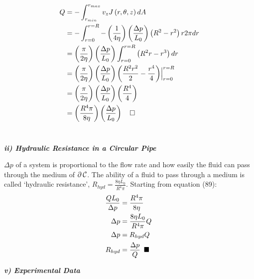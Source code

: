 \documentclass[titlepage]{article}
\begin{document}
    \begin{align}
        Q&= -\int_{r_{min}}^{r_{max}}v_{z}J\left(r,\theta,z\right)dA\\
        &= -\int_{r=0}^{r=R}-\left(\displaystyle\frac{1}{4\eta}\right)
        \left(\displaystyle\frac{\Delta{p}}{L_{0}}\right)\left(R^2-r^2\right){r}2\pi{dr} \\
        &= \left(\displaystyle\frac{\pi}{2\eta}\right)
        \left(\displaystyle\frac{\Delta{p}}{L_{0}}\right)\int_{r=0}^{r=R}\left(R^2r-r^3\right)dr \\
        &=\left(\displaystyle\frac{\pi}{2\eta}\right)
        \left(\displaystyle\frac{\Delta{p}}{L_{0}}\right)\left(\displaystyle\frac{R^2r^2}{2}-\displaystyle\frac{r^4}{4}\right)\Bigr|_{r=0}^{r=R} \\
        &=\left(\displaystyle\frac{\pi}{2\eta}\right)
        \left(\displaystyle\frac{\Delta{p}}{L_{0}}\right)\left(\displaystyle\frac{R^4}{4}\right) \\
        &=\left(\displaystyle\frac{R^4\pi}{8\eta}\right)
        \left(\displaystyle\frac{\Delta{p}}{L_{0}}\right)\hspace*{5pt}\hspace*{5pt}\square
    \end{align} \\
    
    \begin{center}
        \textbf{\emph{ii) Hydraulic Resistance in a Circular Pipe}}
    \end{center}
    $\Delta p$ of a system is proportional to the flow rate and how easily the fluid can pass through the medium of $\partial\hspace*{2pt}\mathcal{C}$. The ability of a fluid to pass through a medium is called `hydraulic resistance', $R_{hyd}=\displaystyle\frac{8\eta{L_{0}}}{R^4\pi}$. Starting from equation (89): 
    \begin{align}
        \displaystyle\frac{{Q}{L_{0}}}{\Delta p} &= \displaystyle\frac{R^4\pi}{8\eta} \\
        \Delta p &= \displaystyle\frac{8\eta{L_{0}}}{R^4\pi}{Q} \\
        \Delta p &= {R_{hyd}}{Q}\hspace*{5pt}\\
        R_{hyd} &= \displaystyle\frac{\Delta p}{Q}\hspace*{5pt}\blacksquare 
    \end{align}
\endgroup

\newpage
\begin{center}
    \textbf{\emph{v) Experimental Data}}
\end{center}
\end{document}
